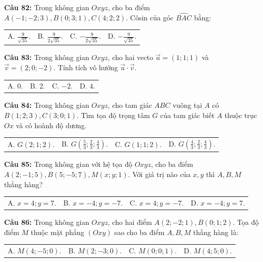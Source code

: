 \documentclass[12pt]{article}
\begin{document}
	\vspace{2mm}
	\noindent \textbf{Câu 82:} Trong không gian $Oxyz$, cho ba điểm $A(-1; -2; 3), B(0; 3; 1), C(4; 2; 2)$. Côsin của góc $\widehat{BAC}$ bằng: \\
	\noindent
	\begin{tabular}{p{} p{} p{} p{}}
		A. $\frac{9}{\sqrt{35}}$. & B. $\frac{9}{2\sqrt{35}}$. & C. $-\frac{9}{2\sqrt{35}}$. & D. $-\frac{9}{\sqrt{35}}$.
	\end{tabular}
	
	\vspace{2mm}
	\noindent \textbf{Câu 83:} Trong không gian $Oxyz$, cho hai vecto $\vec{u} = (1; 1; 1)$ và $\vec{v} = (2; 0; -2)$. Tính tích vô hướng $\vec{u} \cdot \vec{v}$. \\
	\noindent
	\begin{tabular}{p{} p{} p{} p{}}
		A. $0$. & B. $2$. & C. $-2$. & D. $4$.
	\end{tabular}
	
	\vspace{2mm}
	\noindent \textbf{Câu 84:} Trong không gian $Oxyz$, cho tam giác $ABC$ vuông tại $A$ có $B(1; 2; 3), C(3; 0; 1)$. Tìm tọa độ trọng tâm $G$ của tam giác biết $A$ thuộc trục $Ox$ và có hoành độ dương. \\
	\noindent
	\begin{tabular}{p{} p{} p{} p{}}
		A. $G(2; 1; 2)$. & B. $G\left(\frac{5}{3}; \frac{2}{3}; \frac{4}{3}\right)$. & C. $G(1; 1; 2)$. & D. $G\left(\frac{4}{3}; \frac{2}{3}; \frac{4}{3}\right)$.
	\end{tabular}
	
	\noindent \textbf{Câu 85:} Trong không gian với hệ tọa độ $Oxyz$, cho ba điểm $A(2; -1; 5), B(5; -5; 7), M(x; y; 1)$. Với giá trị nào của $x, y$ thì $A, B, M$ thẳng hàng? \\
	\noindent
	\begin{tabular}{p{} p{} p{} p{}}
		A. $x = 4; y = 7$. & B. $x = -4; y = -7$. & C. $x = 4; y = -7$. & D. $x = -4; y = 7$.
	\end{tabular}
	
	\vspace{2mm}
	\noindent \textbf{Câu 86:} Trong không gian $Oxyz$, cho hai điểm $A(2; -2; 1), B(0; 1; 2)$. Tọa độ điểm $M$ thuộc mặt phẳng $(Oxy)$ sao cho ba điểm $A, B, M$ thẳng hàng là: \\
	\noindent
	\begin{tabular}{p{} p{} p{} p{}}
		A. $M(4; -5; 0)$. & B. $M(2; -3; 0)$. & C. $M(0; 0; 1)$. & D. $M(4; 5; 0)$.
	\end{tabular}
	
\end{document}
